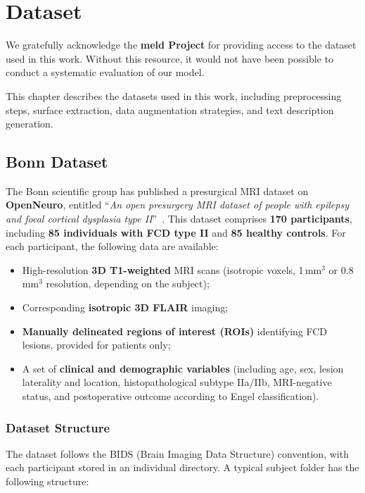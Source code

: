 \documentclass[FCD_GNN.tex]{subfiles}
\begin{document}
\chapter{Dataset}
\label{chapter:Dataset}
We gratefully acknowledge the \textbf{\ac{meld} Project} for providing access to
the dataset used in this work.
Without this resource, it would not have been possible to conduct a systematic
evaluation of our model.

This chapter describes the datasets used in this work, including preprocessing
steps, surface extraction, data augmentation strategies, and text description
generation.

\section{Bonn Dataset}

The Bonn scientific group has published a presurgical MRI dataset on \textbf{OpenNeuro}, entitled 
“\textit{An open presurgery MRI dataset of people with epilepsy and focal cortical dysplasia type II}”~\cite{Rueber2023_BonnFCDDataset}.  
This dataset comprises \textbf{170 participants}, including \textbf{85 individuals with FCD type II} and \textbf{85 healthy controls}. 
For each participant, the following data are available:

\begin{itemize}
    \item High-resolution \textbf{3D T1-weighted} MRI scans (isotropic voxels, 1\,mm$^{3}$ or 0.8\,mm$^{3}$ resolution, depending on the subject);
    \item Corresponding \textbf{isotropic 3D FLAIR} imaging;
    \item \textbf{Manually delineated regions of interest (ROIs)} identifying FCD lesions, provided for patients only;
    \item A set of \textbf{clinical and demographic variables} (including age, sex, lesion laterality and location, histopathological subtype IIa/IIb, MRI-negative status, and postoperative outcome according to Engel classification).
\end{itemize}

\subsection*{Dataset Structure}
The dataset follows the BIDS (Brain Imaging Data Structure) convention, with each
participant stored in an individual directory. A typical subject folder has the 
following structure:
\end{document}
